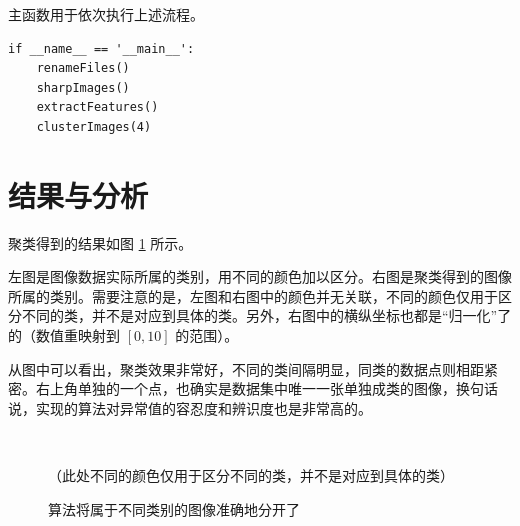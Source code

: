 \documentclass[a4paper, 12pt]{article}
\begin{document}
主函数用于依次执行上述流程。

\begin{lstlisting}[style=myPython,caption={主函数}]
if __name__ == '__main__':
    renameFiles()
    sharpImages()
    extractFeatures()
    clusterImages(4)
\end{lstlisting}

\section{结果与分析}
聚类得到的结果如图 \ref{fig:result} 所示。

左图是图像数据实际所属的类别，用不同的颜色加以区分。右图是聚类得到的图像所属的类别。需要注意的是，左图和右图中的颜色并无关联，不同的颜色仅用于区分不同的类，并不是对应到具体的类。另外，右图中的横纵坐标也都是“归一化”了的（数值重映射到 $[0,10]$ 的范围）。

从图中可以看出，聚类效果非常好，不同的类间隔明显，同类的数据点则相距紧密。右上角单独的一个点，也确实是数据集中唯一一张单独成类的图像，换句话说，实现的算法对异常值的容忍度和辨识度也是非常高的。

\begin{figure}[htbp]
    \centering
    \phantom{123}
    \\
    \caption{算法将属于不同类别的图像准确地分开了}
    （此处不同的颜色仅用于区分不同的类，并不是对应到具体的类）
    \label{fig:result}
\end{figure}
\end{document}

